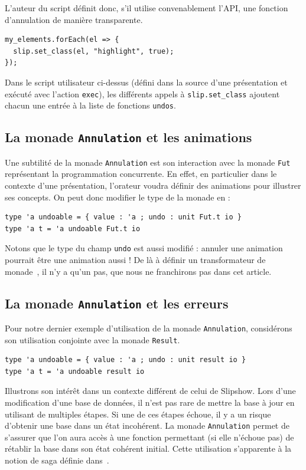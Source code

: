 \documentclass[final]{jflart}
\begin{document}
L'auteur du script définit donc, s'il utilise convenablement l'API, une fonction d'annulation de manière transparente.

\begin{verbatim}
my_elements.forEach(el => {
  slip.set_class(el, "highlight", true);
});
\end{verbatim}

Dans le script utilisateur ci-dessus (défini dans la source d'une présentation et exécuté avec l'action \texttt{exec}), les différents appels à \texttt{slip.set\_class} ajoutent chacun une entrée à la liste de fonctions \texttt{undos}.



\subsection{La monade \texttt{Annulation} et les animations}

Une subtilité de la monade \texttt{Annulation} est son interaction avec
la monade \texttt{Fut} représentant la programmation concurrente. En effet, en
particulier dans le contexte d'une présentation, l'orateur voudra définir des
animations pour illustrer ses concepts. On peut donc modifier le type de la monade en :

\begin{verbatim}
type 'a undoable = { value : 'a ; undo : unit Fut.t io }
type 'a t = 'a undoable Fut.t io
\end{verbatim}

Notons que le type du champ \texttt{undo} est aussi modifié : annuler une
animation pourrait être une animation aussi !
De là à définir un transformateur de monade~\cite{Liang1995}, il n'y a qu'un pas, que nous ne
franchirons pas dans cet article.


\subsection{La monade \texttt{Annulation} et les erreurs}

Pour notre dernier exemple d'utilisation de la monade \texttt{Annulation}, considérons son utilisation conjointe avec la monade \texttt{Result}.

\begin{verbatim}
type 'a undoable = { value : 'a ; undo : unit result io }
type 'a t = 'a undoable result io
\end{verbatim}

Illustrons son intérêt dans un contexte différent de celui de Slipshow. Lors d'une modification d'une base de données, il n'est pas rare de mettre la base à jour en utilisant de multiples étapes. Si une de ces étapes échoue, il y a un risque d'obtenir une base dans un état incohérent. La monade \texttt{Annulation} permet de s'assurer que l'on aura accès à une fonction permettant (si elle n'échoue pas) de rétablir la base dans son état cohérent initial. Cette utilisation s'apparente à la notion de saga définie dans~\cite{GarciaMolina1987}.
\end{document}
